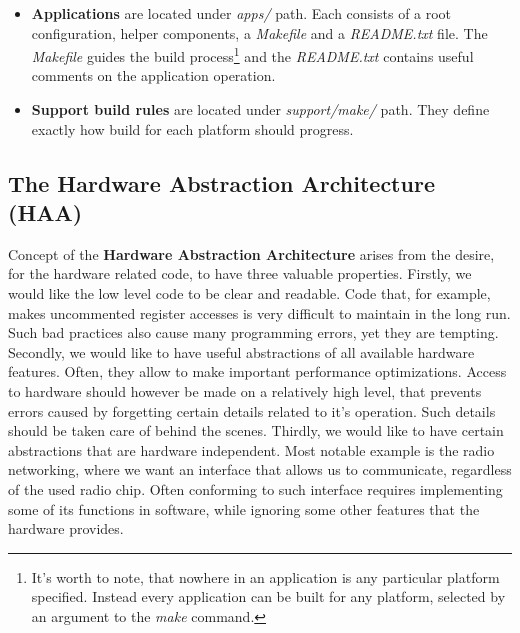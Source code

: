 \begin{itemize}
  \item {\bf Applications} are located under \emph{apps/} path. Each
    consists of a root configuration, helper components, a
    \emph{Makefile} and a \emph{README.txt} file. The \emph{Makefile}
    guides the build process\footnote{It's worth to note, that nowhere
    in an application is any particular platform specified. Instead
    every application can be built for any platform, selected by an
    argument to the \emph{make} command.} and the \emph{README.txt}
    contains useful comments on the application operation.

  \item {\bf Support build rules} are located under
    \emph{support/make/} path. They define exactly how build for each
    platform should progress.

\end{itemize}

\subsection{The Hardware Abstraction Architecture (HAA)}

Concept of the {\bf Hardware Abstraction Architecture} arises from the
desire, for the hardware related code, to have three valuable
properties. Firstly, we would like the low level code to be clear and
readable. Code that, for example, makes uncommented register accesses
is very difficult to maintain in the long run. Such bad practices also
cause many programming errors, yet they are tempting. Secondly, we
would like to have useful abstractions of all available hardware
features. Often, they allow to make important performance
optimizations. Access to hardware should however be made on a
relatively high level, that prevents errors caused by forgetting
certain details related to it's operation. Such details should be
taken care of behind the scenes. Thirdly, we would like to have
certain abstractions that are hardware independent. Most notable
example is the radio networking, where we want an interface that
allows us to communicate, regardless of the used radio chip. Often
conforming to such interface requires implementing some of its
functions in software, while ignoring some other features that the
hardware provides.

